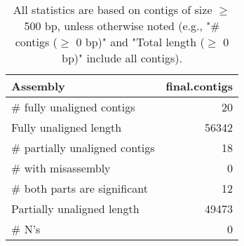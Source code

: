 \documentclass[12pt,a4paper]{article}
\begin{document}
\begin{table}[ht]
\begin{center}
\caption{All statistics are based on contigs of size $\geq$ 500 bp, unless otherwise noted (e.g., "\# contigs ($\geq$ 0 bp)" and "Total length ($\geq$ 0 bp)" include all contigs).}
\begin{tabular}{|l*{1}{|r}|}
\hline
Assembly & final.contigs \\ \hline
\# fully unaligned contigs & 20 \\ \hline
Fully unaligned length & 56342 \\ \hline
\# partially unaligned contigs & 18 \\ \hline
\hspace{5mm}\# with misassembly & 0 \\ \hline
\hspace{5mm}\# both parts are significant & 12 \\ \hline
Partially unaligned length & 49473 \\ \hline
\# N's & 0 \\ \hline
\end{tabular}
\end{center}
\end{table}
\end{document}
